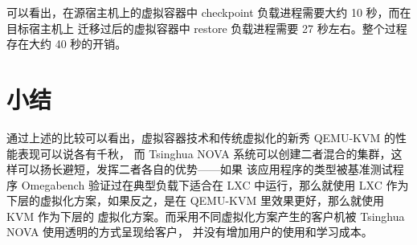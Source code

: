 可以看出，在源宿主机上的虚拟容器中 checkpoint 负载进程需要大约 10 秒，而在目标宿主机上
迁移过后的虚拟容器中 restore 负载进程需要 27 秒左右。整个过程存在大约 40 秒的开销。

\section{小结}

通过上述的比较可以看出，虚拟容器技术和传统虚拟化的新秀 QEMU-KVM 的性能表现可以说各有千秋，
而 Tsinghua NOVA 系统可以创建二者混合的集群，这样可以扬长避短，发挥二者各自的优势——如果
该应用程序的类型被基准测试程序 Omegabench 验证过在典型负载下适合在 LXC 中运行，那么就使用
LXC 作为下层的虚拟化方案，如果反之，是在 QEMU-KVM 里效果更好，那么就使用 KVM 作为下层的
虚拟化方案。而采用不同虚拟化方案产生的客户机被 Tsinghua NOVA 使用透明的方式呈现给客户，
并没有增加用户的使用和学习成本。
